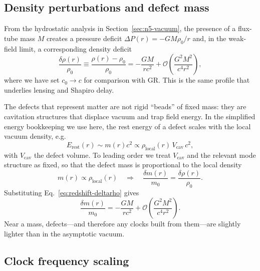 \documentclass[11pt]{article}
\begin{document}
\subsection{Density perturbations and defect mass}
\label{subsec:redshift-density}

From the hydrostatic analysis in Section~\ref{sec:n5-vacuum}, the presence
of a flux-tube mass $M$ creates a pressure deficit
$\Delta P(r) = -GM\rho_0/r$ and, in the weak-field limit, a corresponding
density deficit
\begin{equation}
  \frac{\delta\rho(r)}{\rho_0}
  \equiv \frac{\rho(r) - \rho_0}{\rho_0}
  = -\frac{GM}{r c^2}
  + \mathcal{O}\!\left(\frac{G^2M^2}{c^4 r^2}\right),
  \label{eq:redshift-deltarho}
\end{equation}
where we have set $c_0 \to c$ for comparison with GR.  This is the same
profile that underlies lensing and Shapiro delay.

The defects that represent matter are not rigid ``beads'' of fixed mass:
they are cavitation structures that displace vacuum and trap field energy.
In the simplified energy bookkeeping we use here, the rest energy of a
defect scales with the local vacuum density, e.g.
\begin{equation}
  E_{\text{rest}}(r)
  \sim m(r)c^2
  \propto \rho_{\text{local}}(r)\,V_{\text{cav}}\,c^2,
\end{equation}
with $V_{\text{cav}}$ the defect volume.  To leading order we treat
$V_{\text{cav}}$ and the relevant mode structure as fixed, so that the
defect mass is proportional to the local density
\begin{equation}
  m(r) \propto \rho_{\text{local}}(r)
  \quad\Rightarrow\quad
  \frac{\delta m(r)}{m_0}
  = \frac{\delta\rho(r)}{\rho_0}.
  \label{eq:redshift-dm}
\end{equation}
Substituting Eq.~\eqref{eq:redshift-deltarho} gives
\begin{equation}
  \frac{\delta m(r)}{m_0}
  = -\frac{GM}{r c^2}
  + \mathcal{O}\!\left(\frac{G^2M^2}{c^4 r^2}\right).
  \label{eq:redshift-dm-final}
\end{equation}
Near a mass, defects---and therefore any clocks built from them---are
slightly lighter than in the asymptotic vacuum.


\subsection{Clock frequency scaling}
\label{subsec:redshift-frequency}
\end{document}
